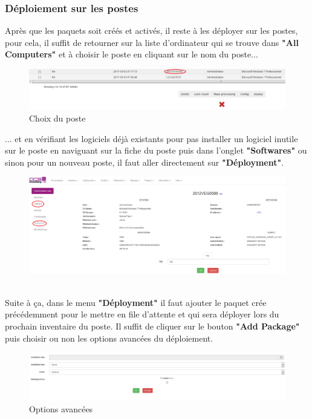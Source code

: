 \documentclass[11pt,a4paper,oneside]{article}
\begin{document}
\subsubsection{Déploiement sur les postes}
Après que les paquets soit créés et activés, il reste à les déployer sur les postes, pour cela, il suffit de retourner sur la liste d'ordinateur qui se trouve dans \textbf{"All Computers"} et à choisir le poste en cliquant sur le nom du poste...
\begin{figure}[hbtp]
\centering
\includegraphics[scale=0.5]{Script/Act_Deploy1.PNG}
\caption{Choix du poste}
\end{figure}

... et en vérifiant les logiciels déjà existants pour pas installer un logiciel inutile sur le poste en naviguant sur la fiche du poste puis dans l'onglet \textbf{"Softwares"} ou sinon pour un nouveau poste, il faut aller directement sur \textbf{"Déployment"}.
\begin{figure}[hbtp]
\centering
\includegraphics[scale=0.41]{Script/Act_Deploy2.PNG}
\end{figure}
\\
Suite à ça, dans le menu \textbf{"Déployment"} il faut ajouter le paquet crée précédemment pour le mettre en file d'attente et qui sera déployer lors du prochain inventaire du poste. Il suffit de cliquer sur le bouton \textbf{"Add Package"} puis choisir ou non les options avancées du déploiement.
\begin{figure}[hbtp]
\centering
\includegraphics[scale=0.4]{Script/Act_Deploy4.PNG}
\caption{Options avancées}
\end{figure}
\end{document}
